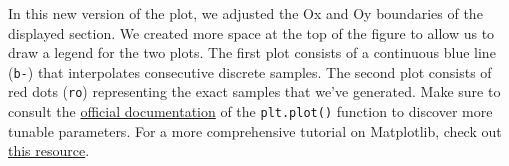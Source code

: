 In this new version of the plot, we adjusted the Ox and Oy boundaries of the
displayed section. We created more space at the top of the figure to allow us
to draw a legend for the two plots. The first plot consists of a continuous
blue line (\texttt{b-}) that interpolates consecutive discrete samples. The
second plot consists of red dots (\texttt{ro}) representing the exact samples
that we've generated. Make sure to consult the
\href{https://matplotlib.org/stable/api/_as_gen/matplotlib.pyplot.plot.html}
{official documentation} of the \texttt{plt.plot()} function to discover more
tunable parameters. For a more comprehensive tutorial on Matplotlib, check out
\href{https://www.machinelearningplus.com/plots/matplotlib-tutorial-complete-guide-python-plot-examples/}
{this resource}.

